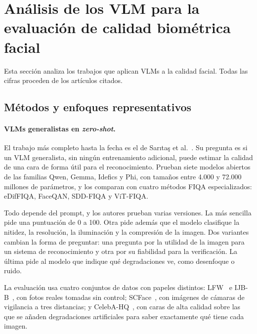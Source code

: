\section{Análisis de los VLM para la evaluación de calidad biométrica facial}
\label{sec:analisis}
Esta sección analiza los trabajos que aplican VLMs a la calidad facial. Todas las cifras proceden de los artículos citados.

\subsection{Métodos y enfoques representativos}
\label{sec:metodos}
\paragraph{VLMs generalistas en \textit{zero-shot}.} El trabajo más completo hasta la fecha es el de Sarıtaş et al.~\cite{Saritas_2026_FG}. Su pregunta es si un VLM generalista, sin ningún entrenamiento adicional, puede estimar la calidad de una cara de forma útil para el reconocimiento. Prueban siete modelos abiertos de las familias Qwen, Gemma, Idefics y Phi, con tamaños entre 4.000 y 72.000 millones de parámetros, y los comparan con cuatro métodos FIQA especializados: eDifFIQA, FaceQAN, SDD-FIQA y ViT-FIQA.

Todo depende del prompt, y los autores prueban varias versiones. La más sencilla pide una puntuación de 0 a 100. Otra pide además que el modelo clasifique la nitidez, la resolución, la iluminación y la compresión de la imagen. Dos variantes cambian la forma de preguntar: una pregunta por la utilidad de la imagen para un sistema de reconocimiento y otra por su fiabilidad para la verificación. La última pide al modelo que indique qué degradaciones ve, como desenfoque o ruido.

La evaluación usa cuatro conjuntos de datos con papeles distintos: LFW~\cite{Huang_2008_ECCVW} e IJB-B~\cite{Whitelam_2017_CVPRW}, con fotos reales tomadas sin control; SCFace~\cite{Grgic_2011_MTAP}, con imágenes de cámaras de vigilancia a tres distancias; y CelebA-HQ~\cite{Karras_2018_ICLR}, con caras de alta calidad sobre las que se añaden degradaciones artificiales para saber exactamente qué tiene cada imagen.

